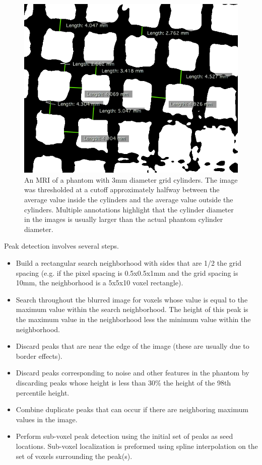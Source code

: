 \documentclass[12pt]{article}
\begin{document}
\begin{figure}
    \centering
    \includegraphics[width=\linewidth]{size-distortion.png}
    \caption{An MRI of a phantom with 3mm diameter grid cylinders.  The image was thresholded at a cutoff approximately halfway between the average value inside the cylinders and the average value outside the cylinders.  Multiple annotations highlight that the cylinder diameter in the images is usually larger than the actual phantom cylinder diameter.}
    \label{fig:size-distortion}
\end{figure}

Peak detection involves several steps.

\begin{itemize}
    \item Build a rectangular search neighborhood with sides that are 1/2 the grid spacing (e.g. if the pixel spacing is 0.5x0.5x1mm and the grid spacing is 10mm, the neighborhood is a 5x5x10 voxel rectangle).
    \item Search throughout the blurred image for voxels whose value is equal to the maximum value within the search neighborhood.  The height of this peak is the maximum value in the neighborhood less the minimum value within the neighborhood.
    \item Discard peaks that are near the edge of the image (these are usually due to border effects).
    \item Discard peaks corresponding to noise and other features in the phantom by discarding peaks whose height is less than 30\% the height of the 98th percentile height.
    \item Combine duplicate peaks that can occur if there are neighboring maximum values in the image.
    \item Perform sub-voxel peak detection using the initial set of peaks as seed locations.  Sub-voxel localization is preformed using spline interpolation on the set of voxels surrounding the peak(s).
\end{itemize}
\end{document}
